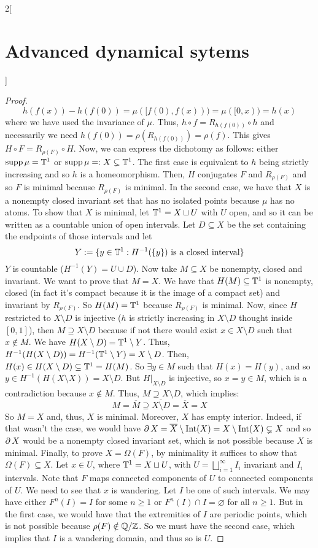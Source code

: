 \documentclass[../../../main_math.tex]{subfiles}
\begin{document}
\begin{multicols}{2}[\section{Advanced dynamical sytems}]
\begin{proof}
    $$
      h(f(x))-h(f(0))=\mu([f(0),f(x)))=\mu([0,x))=h(x)
    $$
    where we have used the invariance of $\mu$. Thus, $h\circ f=R_{h(f(0))}\circ h$ and necessarily we need $h(f(0))=\rho(R_{h(f(0))})=\rho(f)$. This gives $H\circ F=R_{\rho(F)}\circ H$. Now, we can express the dichotomy as follows: either $\operatorname{supp}\mu=\mathbb{T}^1$ or $\operatorname{supp}\mu=:X\subsetneq \mathbb{T}^1$. The first case is equivalent to $h$ being strictly increasing and so $h$ is a homeomorphism. Then, $H$ conjugates $F$ and $R_{\rho(F)}$ and so $F$ is minimal because $R_{\rho(F)}$ is minimal. In the second case, we have that $X$ is a nonempty closed invariant set that has no isolated points because $\mu$ has no atoms. To show that $X$ is minimal, let $\mathbb{T}^1=X\sqcup U$ with $U$ open, and so it can be written as a countable union of open intervals. Let $D\subseteq X$ be the set containing the endpoints of those intervals and let
    \begin{equation}\label{ADS:eq1}
      Y:=\{y\in\mathbb{T}^1:H^{-1}(\{y\})\text{ is a closed interval}\}
    \end{equation}
    $Y$ is countable ($H^{-1}(Y)=U\cup D$). Now take $M\subseteq X$ be nonempty, closed and invariant. We want to prove that $M=X$. We have that $H(M)\subseteq \mathbb{T}^1$ is nonempty, closed (in fact it's compact because it is the image of a compact set) and invariant by $R_{\rho(F)}$. So $H(M)=\mathbb{T}^1$ because $R_{\rho(F)}$ is minimal. Now, since $H$ restricted to $X\setminus D$ is injective ($h$ is strictly increasing in $X\setminus D$ thought inside $[0,1]$), then $M\supseteq X\setminus D$ because if not there would exist $x\in X\setminus D$ such that $x\notin M$. We have $H(X\setminus D)=\mathbb{T}^1\setminus Y$. Thus, $H^{-1}(H(X\setminus D))=H^{-1}(\mathbb{T}^1\setminus Y)=X\setminus D$. Then, $H(x)\in H(X\setminus D)\subseteq \mathbb{T}^1=H(M)$. So $\exists y\in M$ such that $H(x)=H(y)$, and so $y\in H^{-1}(H(X\setminus X))=X\setminus D$. But $H|_{X\setminus D}$ is injective, so $x=y\in M$, which is a contradiction because $x\notin M$. Thus, $M\supseteq X\setminus D$, which implies:
    $$
      M=\overline{M}\supseteq \overline{X\setminus D}=\overline{X} = X
    $$
    So $M=X$ and, thus, $X$ is minimal. Moreover, $X$ has empty interior. Indeed, if that wasn't the case, we would have $\operatorname{\partial}{X}=\overline{X}\setminus\operatorname{Int}(X)=X\setminus \operatorname{Int}(X)\subsetneq X$ and so $\operatorname{\partial}{X}$ would be a nonempty closed invariant set, which is not possible because $X$ is minimal. Finally, to prove $X=\Omega(F)$, by minimality it suffices to show that $\Omega(F)\subseteq X$. Let $x\in U$, where $\mathbb{T}^1=X\sqcup U$, with $U=\bigsqcup_{i=1}^\infty I_i$ invariant and $I_i$ intervals. Note that $F$ maps connected components of $U$ to connected components of $U$. We need to see that $x$ is wandering. Let $I$ be one of such intervals. We may have either $F^n(I)=I$ for some $n\geq 1$ or $F^n(I)\cap I=\varnothing$ for all $n\geq 1$. But in the first case, we would have that the extremities of $I$ are periodic points, which is not possible because $\rho(F)\notin\quot{\QQ}{\ZZ}$. So we must have the second case, which implies that $I$ is a wandering domain, and thus so is $U$.
  \end{proof}

\end{multicols}
\end{document}
